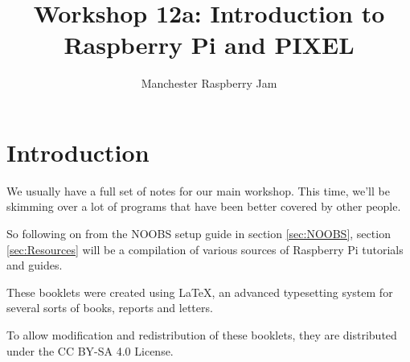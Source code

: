 \documentclass[a4paper, twocolumn, twoside, 11pt]{article}
\begin{document}
	\author{Manchester Raspberry Jam}
	\title{Workshop 12a: Introduction to Raspberry Pi and PIXEL}
	\date{}
	\maketitle
	
	\setcounter{tocdepth}{1}
	\tableofcontents
	
	\setcounter{section}{-1}
	\section{Introduction}
		We usually have a full set of notes for our main workshop. This time, we'll be skimming over a lot of programs that have been better covered by other people.
		
		So following on from the NOOBS setup guide in section \ref{sec:NOOBS}, section \ref{sec:Resources} will be a compilation of various sources of Raspberry Pi tutorials and guides.
		
		These booklets were created using {\selectfont \LaTeX}, an advanced typesetting system for several sorts of books, reports and letters.
		
		To allow modification and redistribution of these booklets, they are distributed under the CC BY-SA 4.0 License.
	
	
		
\end{document}
